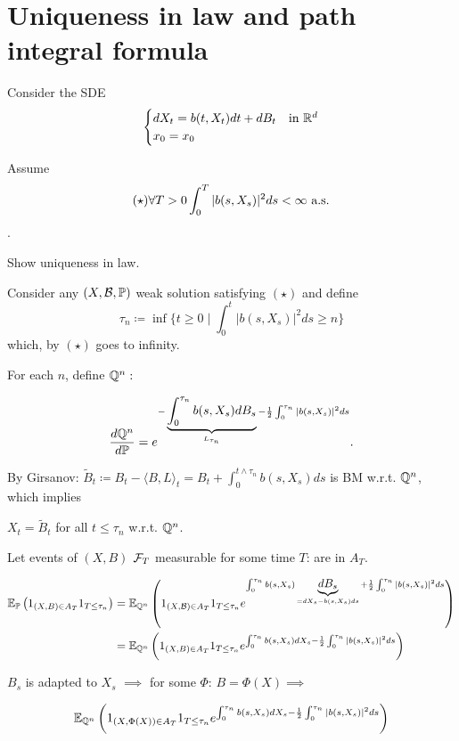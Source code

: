 \section{Uniqueness in law and path integral formula}

Consider the SDE \[\begin{cases}
    dX_t=b(t,X_t)dt+dB_t & \text{in }\mathbb{R}^d\\
    x_0=x_0
\end{cases}\]

Assume \begin{equation*}\
   (\star) \forall T>0 \int_0^T|b(s,X_s)|^2ds < \infty\text{ a.s. }
\end{equation*}.

 Show uniqueness in law.

Consider any $(X,\mathcal{B},\mathbb{P})$ weak solution satisfying $(\star)$ 
and define\[\tau_n\coloneqq \inf\{t\geq 0\mid \int_0^t|b(s,X_s)|^2ds\geq n\}\]
which, by $(\star)$ goes to infinity.

For each $n$, define $\mathbb{Q}^n:$

\[\frac{d\mathbb{Q}^n}{d\mathbb{P}}=e^{-\underbrace{\int_0^{\tau_n}b(s,X_s)dB_s}_{L_{\tau_n}}-\frac{1}{2}\int_0^{\tau_n}|b(s,X_s)|^2ds}.\]

By Girsanov: $\tilde{B}_t\coloneqq B_t-\langle B,L\rangle_t=B_t+\int_0^{t\land \tau_n} b(s,X_s)ds$
is BM w.r.t. $\mathbb{Q}^n$, which implies 

$X_t=\tilde{B}_t$ for all $t\leq \tau_n$ w.r.t. $\mathbb{Q}^n$.

Let events of $(X,B)$ $\mathcal{F}_T$ measurable for some time $T$: are in $A_T$.

\begin{align*}
    \mathbb{E}_{\mathbb{P}}\left(1_{(X,B)\in A_T}1_{T\leq \tau_n}\right)&=\mathbb{E}_{\mathbb{Q}^n}\left(1_{(X,\mathcal{B})\in A_T}1_{T\leq \tau_n}e^{\int_0^{\tau_n} b(s,X_s)\underbrace{dB_s}_{=dX_s-b(s,X_s)ds}+\frac{1}{2}\int_0^{\tau_n}|b(s,X_s)|^2ds}\right) \\
    &=\mathbb{E}_{\mathbb{Q}^n}\left(1_{(X,B)\in A_T}1_{T\leq \tau_n}e^{\int_0^{\tau_n} b(s,X_s)d X_s-\frac{1}{2}\int_0^{\tau_n}|b(s,X_s)|^2ds}\right) 
\end{align*}

$B_s$ is adapted to $X_s$ $\implies$ for some $\Phi$: $B=\Phi(X)\implies$

\begin{align*}
    \mathbb{E}_{\mathbb{Q}^n}\left(1_{(X,\Phi(X))\in A_T}1_{T\leq \tau_n}e^{\int_0^{\tau_n} b(s,X_s)d X_s-\frac{1}{2}\int_0^{\tau_n}|b(s,X_s)|^2ds}\right)    
\end{align*}

